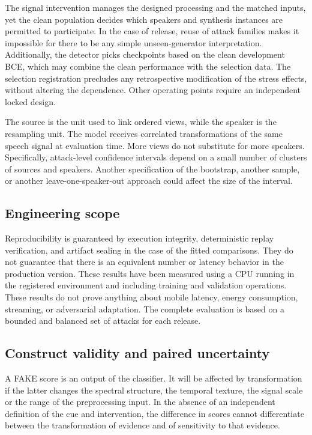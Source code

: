 The signal intervention manages the designed processing and the matched inputs, yet the clean population decides which speakers and synthesis instances are permitted to participate. In the case of release, reuse of attack families makes it impossible for there to be any simple unseen-generator interpretation. Additionally, the detector picks checkpoints based on the clean development BCE, which may combine the clean performance with the selection data. The selection registration precludes any retrospective modification of the stress effects, without altering the dependence. Other operating points require an independent locked design.

The source is the unit used to link ordered views, while the speaker is the resampling unit. The model receives correlated transformations of the same speech signal at evaluation time. More views do not substitute for more speakers. Specifically, attack-level confidence intervals depend on a small number of clusters of sources and speakers. Another specification of the bootstrap, another sample, or another leave-one-speaker-out approach could affect the size of the interval.

\subsection{Engineering scope}

Reproducibility is guaranteed by execution integrity, deterministic replay verification, and artifact sealing in the case of the fitted comparisons. They do not guarantee that there is an equivalent number or latency behavior in the production version. These results have been measured using a CPU running in the registered environment and including training and validation operations. These results do not prove anything about mobile latency, energy consumption, streaming, or adversarial adaptation. The complete evaluation is based on a bounded and balanced set of attacks for each release.

\subsection{Construct validity and paired uncertainty}

A FAKE score is an output of the classifier. It will be affected by transformation if the latter changes the spectral structure, the temporal texture, the signal scale or the range of the preprocessing input. In the absence of an independent definition of the cue and intervention, the difference in scores cannot differentiate between the transformation of evidence and of sensitivity to that evidence.

